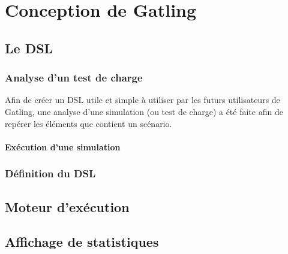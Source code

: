 \chapter{Conception de Gatling}
\section{Le DSL}
\subsection{Analyse d'un test de charge}
Afin de créer un DSL utile et simple à utiliser par les futurs utilisateurs de Gatling, une analyse d'une simulation (ou test de charge) a été faite afin de repérer les éléments que contient un scénario.

\subsubsection{Exécution d'une simulation}



\subsection{Définition du DSL}
\section{Moteur d'exécution}
\section{Affichage de statistiques}